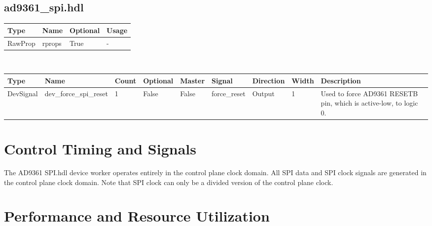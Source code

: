 \documentclass{article}
\def\comp{ad9361\_spi}
\def\Comp{AD9361 SPI}
\begin{document}
\begin{landscape}
	\subsection*{\comp.hdl}
	\begin{scriptsize}
		\begin{tabular}{|p{2cm}|p{1.5cm}|p{1.5cm}|p{15.74cm}|}
			\hline
			\rowcolor{blue}
			Type            & Name & Optional & Usage                  \\
			\hline
			RawProp & rprops  & True & - \\
			\hline
		\end{tabular}
	\end{scriptsize} \\
	\begin{scriptsize}
		\begin{tabular}{|p{1.5cm}|p{2.4cm}|p{1.05cm}|p{1.25cm}|p{1.2cm}|p{2cm}|p{1.4cm}|p{0.9cm}|p{6.88cm}|}
			\hline
			\rowcolor{blue}
			Type                       & Name                            & Count & Optional & Master                & Signal                & Direction                  & Width                    & Description                                                                                                                  \\
			\hline
			DevSignal & dev\_force\_spi\_reset & 1 & False & False & force\_reset & Output & 1 & Used to force AD9361 RESETB pin, which is active-low, to logic 0. \\
			\hline
		\end{tabular}
	\end{scriptsize}
\end{landscape}

\section*{Control Timing and Signals}
The \Comp{}.hdl device worker operates entirely in the control plane clock domain. All SPI data and SPI clock signals are generated in the control plane clock domain. Note that SPI clock can only be a divided version of the control plane clock.

\section*{Performance and Resource Utilization}
\end{document}
